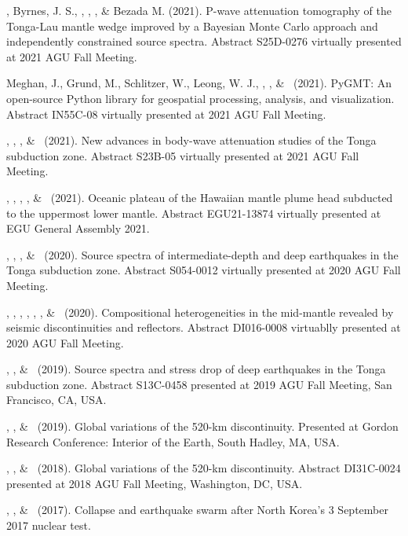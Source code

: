 \begin{etaremune}
\item \YZhang, Byrnes, J. S., \SWei, \Me, \FWang, \& Bezada M. (2021).
    P-wave attenuation tomography of the Tonga-Lau mantle wedge improved
    by a Bayesian Monte Carlo approach and independently constrained source spectra.
    Abstract S25D-0276 virtually presented at 2021 AGU Fall Meeting.
\item Meghan, J., Grund, M., Schlitzer, W., Leong, W. J., \Me, \JYao, \& \LUieda\ (2021).
    PyGMT: An open-source Python library for geospatial processing, analysis, and visualization.
    Abstract IN55C-08 virtually presented at 2021 AGU Fall Meeting.
\item \SWei, \YZhang, \Me, \& \DWiens\ (2021).
    New advances in body-wave attenuation studies of the Tonga subduction zone.
    Abstract S23B-05 virtually presented at 2021 AGU Fall Meeting.
\item \SWei, \PShearer, \CLithgowBertelloni, \LStixrude, \& \Me\ (2021).
    Oceanic plateau of the Hawaiian mantle plume head subducted to the uppermost lower mantle.
    Abstract EGU21-13874 virtually presented at EGU General Assembly 2021.
\item \Me, \WWang, \FWang, \& \SWei\ (2020).
    Source spectra of intermediate-depth and deep earthquakes in the Tonga subduction zone.
    Abstract S054-0012 virtually presented at 2020 AGU Fall Meeting.
\item \SWei, \Me, \PShearer, \MLv, \SDorfman, \CLithgowBertelloni, \& \LStixrude\ (2020).
    Compositional heterogeneities in the mid-mantle revealed by seismic discontinuities and reflectors.
    Abstract DI016-0008 virtuablly presented at 2020 AGU Fall Meeting.
\item \Me, \WWang, \& \SWei\ (2019).
    Source spectra and stress drop of deep earthquakes in the Tonga subduction zone.
    Abstract S13C-0458 presented at 2019 AGU Fall Meeting, San Francisco, CA, USA.
\item
    \Me, \SWei, \& \PShearer\ (2019).
    Global variations of the 520-km discontinuity.
    Presented at Gordon Research Conference: Interior of the Earth, South Hadley, MA, USA.
\item
    \Me, \SWei, \& \PShearer\ (2018).
    Global variations of the 520-km discontinuity.
    Abstract DI31C-0024 presented at 2018 AGU Fall Meeting, Washington, DC, USA.
\item
    \Me, \JYao, \& \LWen\ (2017).
    Collapse and earthquake swarm after North Korea's 3 September 2017 nuclear test.

\end{etaremune}
